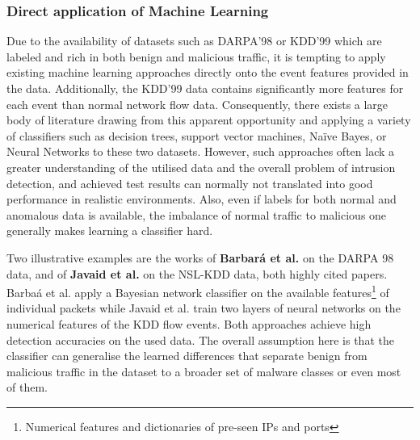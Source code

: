 \documentclass[a4paper,12pt,twoside]{report}
\begin{document}
\subsubsection{Direct application of Machine Learning}

Due to the availability of datasets such as DARPA'98 or KDD'99 which are labeled and rich in both benign and malicious traffic, it is tempting to apply existing machine learning approaches directly onto the event features provided in the data. Additionally, the KDD'99 data contains significantly more features for each event than normal network flow data. Consequently, there exists a large body of literature drawing from this apparent opportunity and applying a variety of classifiers such as  decision trees, support vector machines, Na\"ive Bayes, or Neural Networks to these two datasets. However, such approaches often lack a greater understanding of the utilised data and the overall problem of intrusion detection, and achieved test results can normally not translated into good performance in realistic environments. Also, even if labels for both normal and anomalous data is available, the imbalance of normal traffic to malicious one generally makes learning a classifier hard.

Two illustrative examples are the works of \textbf{Barbar\'a et al.} \cite{barbara2001detecting} on the DARPA 98 data, and of \textbf{Javaid et al.} \cite{javaid2016deep} on the NSL-KDD data, both highly cited papers. Barba\'a et al. apply a Bayesian network classifier on the available features\footnote{Numerical features and dictionaries of pre-seen IPs and ports} of individual packets while Javaid et al. train two layers of neural networks on the numerical features of the KDD flow events. Both approaches achieve high detection accuracies on the used data. The overall assumption here is that the classifier can generalise the learned differences that separate benign from malicious traffic in the dataset to a broader set of malware classes or even most of them. 
\end{document}
